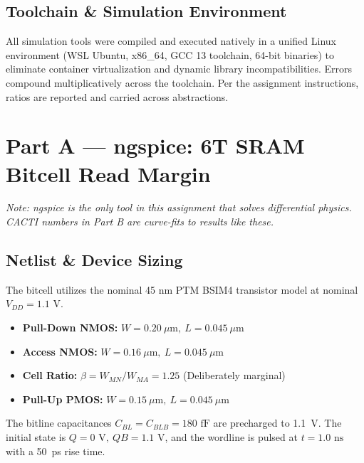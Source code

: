 \documentclass[10pt,a4paper,twocolumn]{article}
\begin{document}
\subsection{Toolchain \& Simulation Environment}
All simulation tools were compiled and executed natively in a unified Linux environment (WSL Ubuntu, x86\_64, GCC 13 toolchain, 64-bit binaries) to eliminate container virtualization and dynamic library incompatibilities. Errors compound multiplicatively across the toolchain. Per the assignment instructions, ratios are reported and carried across abstractions.

\section{Part A — ngspice: 6T SRAM Bitcell Read Margin}

\textit{Note: ngspice is the only tool in this assignment that solves differential physics. CACTI numbers in Part B are curve-fits to results like these.}

\subsection{Netlist \& Device Sizing}
The bitcell utilizes the nominal 45 nm PTM BSIM4 transistor model at nominal $V_{DD} = 1.1\text{ V}$.
\begin{itemize}[leftmargin=*]
    \item \textbf{Pull-Down NMOS:} $W = 0.20\ \mu\text{m},\ L = 0.045\ \mu\text{m}$
    \item \textbf{Access NMOS:} $W = 0.16\ \mu\text{m},\ L = 0.045\ \mu\text{m}$
    \item \textbf{Cell Ratio:} $\beta = W_{MN} / W_{MA} = 1.25$ (Deliberately marginal)
    \item \textbf{Pull-Up PMOS:} $W = 0.15\ \mu\text{m},\ L = 0.045\ \mu\text{m}$
\end{itemize}
The bitline capacitances $C_{BL} = C_{BLB} = 180\text{ fF}$ are precharged to 1.1~V. The initial state is $Q = 0\text{ V},\ QB = 1.1\text{ V}$, and the wordline is pulsed at $t = 1.0\text{ ns}$ with a 50~ps rise time.
\end{document}
